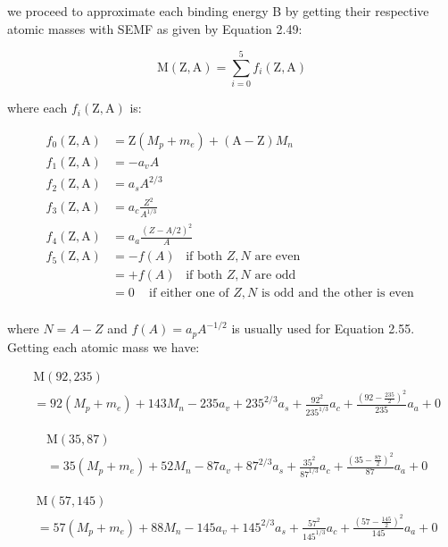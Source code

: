 \documentclass[11pt]{article}
\theoremstyle{definition}
\begin{document}
we proceed to approximate each binding energy B by getting their respective atomic masses with SEMF as given by Equation 2.49:

\begin{equation*}
    \text{M}(\text{Z},\text{A}) = \sum_{i=0}^{5} f_i(\text{Z},\text{A}) \tag{2.49}
\end{equation*}

where each $f_i(\text{Z},\text{A})$ is:

\begin{align*}
    f_0(\text{Z},\text{A}) &= \text{Z}(M_p + m_e) + (\text{A}-\text{Z})M_n \tag{2.50}\\
    f_1(\text{Z},\text{A}) &= -a_v  A \tag{2.51}\\
    f_2(\text{Z},\text{A}) &= a_s A^{2/3} \tag{2.52}\\
    f_3(\text{Z},\text{A}) &= a_c \frac{Z^2}{A^{1/3}} \tag{2.53}\\
    f_4(\text{Z},\text{A}) &= a_a \frac{(Z-A/2)^2}{A} \tag{2.54}\\
    f_5(\text{Z},\text{A}) &= -f(A)\;\;\; \text{if both } Z,N \text{ are even} \\
    &= +f(A)\;\;\; \text{if both } Z,N \text{ are odd} \tag{2.55}\\
    &= 0 \;\;\; \text{ if either one of } Z,N \text{ is odd and the other is even } \\
\end{align*}

where $N=A-Z$ and $f(A) = a_p A^{-1/2}$ is usually used for Equation 2.55. Getting each atomic mass we have:

\begin{align*}
    &\text{M}(92,235) \\
    &=  92(M_p + m_e) + 143M_n - 235a_v + 235^{2/3}a_s + \frac{92^2}{235^{1/3}}a_c + \frac{(92-\frac{235}{2})^2}{235}a_a + 0 \tag{2.56.1}
\end{align*}

\begin{align*}
    &\text{M}(35,87) \\
    &=  35(M_p + m_e) + 52M_n - 87a_v + 87^{2/3}a_s + \frac{35^2}{87^{1/3}}a_c + \frac{(35-\frac{87}{2})^2}{87}a_a + 0 \tag{2.56.2}
\end{align*}

\begin{align*}
    &\text{M}(57,145)  \\
    &=  57(M_p + m_e) + 88M_n - 145a_v + 145^{2/3}a_s + \frac{57^2}{145^{1/3}}a_c + \frac{(57-\frac{145}{2})^2}{145}a_a + 0 \tag{2.56.3}
\end{align*}
\end{document}
